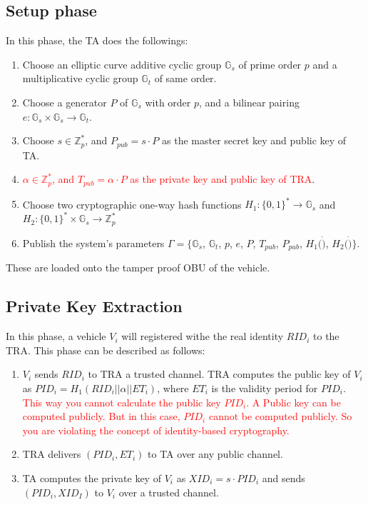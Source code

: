 \documentclass[10pt,journal,letterpaper]{IEEEtran}
\begin{document}
\subsection{Setup phase}
In this phase, the TA does the followings:
\begin{enumerate}[label=\textbf{(\arabic*).}]
\item Choose an elliptic curve additive cyclic group $\mathbb{G}_{s}$
of prime order $p$ and a multiplicative cyclic group
$\mathbb{G}_{t}$ of same order.

\item Choose a generator $P$ of $\mathbb{G}_{s}$ with order $p$, and
a bilinear pairing $e: \mathbb{G}_{s}\times
\mathbb{G}_{s}\xrightarrow{}\mathbb{G}_{t}$.

\item Choose $s\in\mathbb{Z}^{*}_{p}$, and $P_{pub} = s\cdot P$ as the
master secret key and public key of TA.

\item \textcolor{red}{$\alpha\in\mathbb{Z}^{*}_{p}$, and $T_{pub} = \alpha\cdot P$
as the private key and public key of TRA}.

\item Choose two cryptographic one-way hash functions $H_{1}:\{0, 1\}^{*}\xrightarrow{}\mathbb{G}_{s}$
and $H_2: \{0,1\}^{*}\times \mathbb{G}_{s}\xrightarrow{}
\mathbb{Z}^{*}_{p}$

\item Publish the system's parameters $\Gamma = \{\mathbb{G}_{s}$, $\mathbb{G}_{t}$, $p$, $e$, $P$, $T_{pub}$, $P_{pub}$, $H_{1}(\dot)$, $H_{2}(\dot)\}$.
\end{enumerate}
These are loaded onto the tamper proof OBU of the vehicle.

\subsection{Private Key Extraction}
In this phase, a vehicle $V_{i}$ will registered withe the real
identity $RID_{i}$ to the TRA. This phase can be described as
follows:
\begin{enumerate}[label=\textbf{(\arabic*).}]
\item $V_{i}$ sends $RID_i$ to TRA a trusted channel.
TRA computes the public key of $V_{i}$ as $PID_{i} =
H_{1}(RID_{i}||\alpha||ET_i)$, where $ET_i$ is the validity period
for $PID_i$. \textcolor{red}{This way you cannot calculate the
public key $PID_{i}$. A Public key can be computed publicly. But in
this case, $PID_{i}$ cannot be computed publicly. So you are
violating the concept of identity-based cryptography.}
\item TRA delivers $(PID_i, ET_i)$ to TA over any public channel.
\item TA computes the private key of $V_{i}$ as $XID_i =  s\cdot PID_i$ and
sends $(PID_i, XID_I)$ to $V_{i}$ over a trusted channel.
\end{enumerate}
\end{document}
